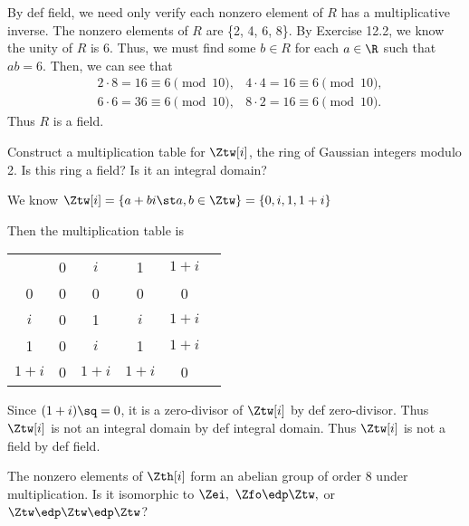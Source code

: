 \documentclass{article}
\begin{document}
\begin{solution} %
  By def field, we need only verify each nonzero element of \( R \) has a multiplicative inverse. The nonzero elements of \( R \) are \{2, 4, 6, 8\}. By Exercise 12.2, we know the unity of \( R \) is 6. Thus, we must find some \( b\in R \) for each \( a\in\R \) such that \( ab = 6 \). Then, we can see that
  \begin{align*}
    &2\cdot 8 = 16 \equiv 6 \pmod{10}, &4\cdot 4 = 16 \equiv 6 \pmod{10}, \\
    &6\cdot 6 = 36 \equiv 6 \pmod{10}, &8\cdot 2 = 16 \equiv 6 \pmod{10}.
  \end{align*}
  Thus \( R \) is a field.
\end{solution}

Construct a multiplication table for \( \Ztw[i] \), the ring of Gaussian integers modulo 2. Is this ring a field? Is it an integral domain?

\begin{solution} %
  We know \( \Ztw[i] = \{a+bi\st a,b\in\Ztw\} = \{0, i, 1, 1+i\} \)

  Then the multiplication table is
  \begin{center}
    \begin{tabular}{c | c c c c c}
                  & 0       & \( i \)   & 1         & \( 1+i \) \\ \cline{1-5}
        0         & 0       & 0         & 0         & 0  \\
        \( i \)   & 0       & 1         & \( i \)   & \( 1+i \)  \\
        1         & 0       & \( i \)   & 1         & \( 1+i \)  \\
        \( 1+i \) & 0       & \( 1+i \) & \( 1+i \) & 0
    \end{tabular}
  \end{center}
  Since \( (1+i)\sq = 0 \), it is a zero-divisor of \( \Ztw[i] \) by def zero-divisor. Thus \( \Ztw[i] \) is not an integral domain by def integral domain.
  Thus \( \Ztw[i] \) is not a field by def field.
\end{solution}

The nonzero elements of \( \Zth[i] \) form an abelian group of order 8 under multiplication. Is it isomorphic to \( \Zei,\ \Zfo\edp\Ztw, \) or \( \Ztw\edp\Ztw\edp\Ztw \)?
\end{document}
